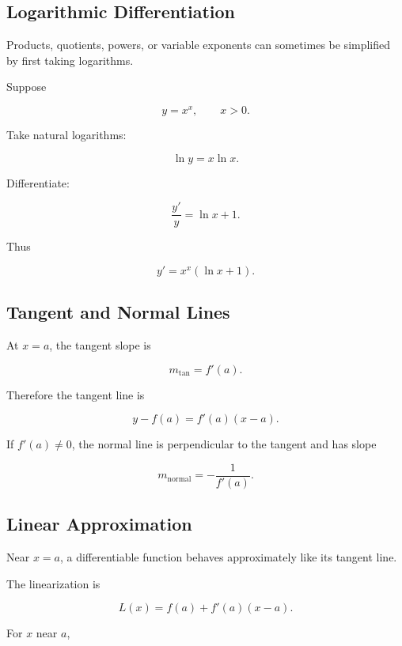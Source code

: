 \subsection{Logarithmic Differentiation}
\label{subsec:logarithmic-differentiation}

Products, quotients, powers, or variable exponents can sometimes be
simplified by first taking logarithms.

Suppose

\[ y=x^x,\qquad x>0. \]

Take natural logarithms:

\[ \ln y=x\ln x. \]

Differentiate:

\[ \frac{y'}{y}=\ln x+1. \]

Thus

\[ \boxed{y'=x^x(\ln x+1).} \]

\subsection{Tangent and Normal Lines}
\label{subsec:tangent-normal-lines}

At \(x=a\), the tangent slope is

\[ m_{\mathrm{tan}}=f'(a). \]

Therefore the tangent line is

\[ y-f(a)=f'(a)(x-a). \]

If \(f'(a)\neq0\), the normal line is perpendicular to the tangent and has
slope

\[ m_{\mathrm{normal}}=-\frac1{f'(a)}. \]

\subsection{Linear Approximation}
\label{subsec:linear-approximation}

Near \(x=a\), a differentiable function behaves approximately like its
tangent line.

The linearization is

\[ L(x)=f(a)+f'(a)(x-a). \]

For \(x\) near \(a\),

